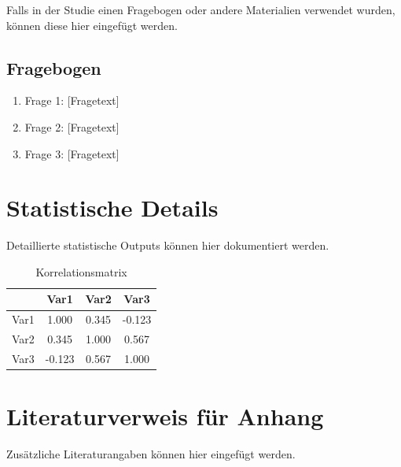 Falls in der Studie einen Fragebogen oder andere Materialien verwendet wurden,
können diese hier eingefügt werden.

\subsection{Fragebogen}

\begin{enumerate}
    \item Frage 1: [Fragetext]
    \item Frage 2: [Fragetext]
    \item Frage 3: [Fragetext]
\end{enumerate}

\section{Statistische Details}
\label{app:statistics}

Detaillierte statistische Outputs können hier dokumentiert werden.

\begin{table}[h]
    \centering
    \caption{Korrelationsmatrix}
    \label{tab:correlations}
    \begin{tabular}{lccc}
        \toprule
             & \textbf{Var1} & \textbf{Var2} & \textbf{Var3} \\
        \midrule
        Var1 & 1.000         & 0.345         & -0.123        \\
        Var2 & 0.345         & 1.000         & 0.567         \\
        Var3 & -0.123        & 0.567         & 1.000         \\
        \bottomrule
    \end{tabular}
\end{table}

\section{Literaturverweis für Anhang}
\label{app:literature}

Zusätzliche Literaturangaben können hier eingefügt werden.

